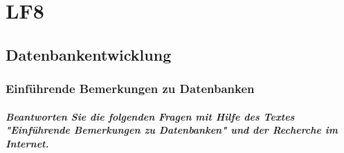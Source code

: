 \chapter{\Huge{LF8}}\label{ch:lf8}
\section{Datenbankentwicklung}\label{sec:lf8_first_Section}
\subsection{Einführende Bemerkungen zu Datenbanken}\label{subsec:einfuhrende-bemerkungen-zu-datenbanken}
\paragraph{Beantworten Sie die folgenden Fragen mit Hilfe des Textes "Einführende Bemerkungen zu Datenbanken" und der Recherche im Internet.}
